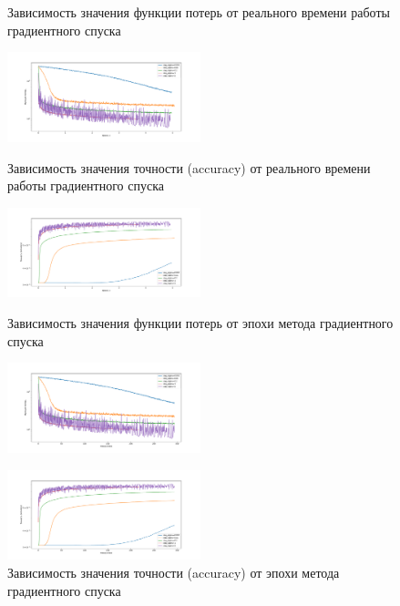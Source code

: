 \documentclass[a4paper, 11pt]{article}
\begin{document}
            \begin{figure}[H] \label{exp1}
                \begin{multicols}{2}
                    \begin{center}
                        \caption{Зависимость значения функции потерь от реального времени работы градиентного спуска} \label{exp1:sgd_func_time}
                        \includegraphics[width=0.5\textwidth, height=0.25\textheight]{../graphs/exp1_func_SGD_alpha_time_beta=0,001_bs=4096.pdf}
                        
                        \caption{Зависимость значения точности (accuracy) от реального времени работы градиентного спуска} \label{exp1:sgd_acc_time}
                        \includegraphics[width=0.5\textwidth, height=0.25\textheight]{../graphs/exp1_accuracy_SGD_alpha_time_beta=0,001_bs=4096.pdf}
                        
                        \caption{Зависимость значения функции потерь от эпохи метода градиентного спуска} \label{exp1:sgd_func_iter}
                        \includegraphics[width=0.5\textwidth, height=0.25\textheight]{../graphs/exp1_func_SGD_alpha_epoch_num_beta=0,001_bs=4096.pdf}
                        
                        \caption{Зависимость значения точности (accuracy) от эпохи метода градиентного спуска} \label{exp1:sgd_acc_iter}
                        \includegraphics[width=0.5\textwidth, height=0.25\textheight]{../graphs/exp1_accuracy_SGD_alpha_epoch_num_beta=0,001_bs=4096.pdf}
                    \end{center}
                \end{multicols}
            \end{figure}
\end{document}

